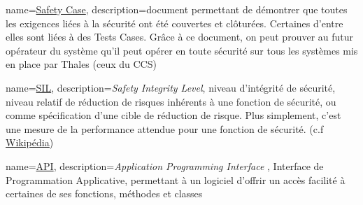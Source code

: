{
	name=\underline{Safety Case},
	description={document permettant de démontrer que toutes les exigences liées à la sécurité ont été couvertes et clôturées. Certaines d'entre elles sont liées à des Tests Cases. Grâce à ce document, on peut prouver au futur opérateur du système qu'il peut opérer en toute sécurité sur tous les systèmes mis en place par Thales (ceux du CCS)}
	}

{
	name=\underline{SIL},
	description={\textit{Safety Integrity Level}, niveau d'intégrité de sécurité, niveau relatif de réduction de risques inhérents à une fonction de sécurité, ou comme spécification d'une cible de réduction de risque. Plus simplement, c'est une mesure de la performance attendue pour une fonction de sécurité. (c.f \underline{\href{https://fr.wikipedia.org/wiki/Safety_Integrity_Level}{Wikipédia}})}
}

{
	name=\underline{API},
	description={\textit{Application Programming Interface }, Interface de Programmation Applicative, permettant à un logiciel d'offrir un accès facilité à certaines de ses fonctions, méthodes et classes}
}



\glsaddall
